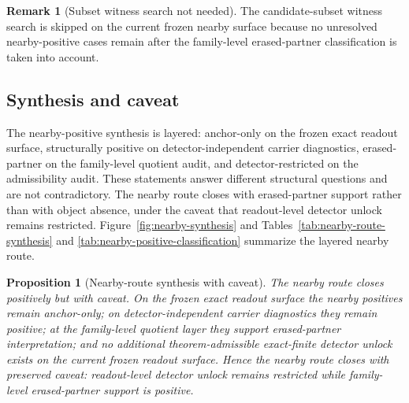 \documentclass[11pt]{article}
\newtheorem{proposition}[theorem]{Proposition}
\theoremstyle{definition}
\newtheorem{remark}[theorem]{Remark}
\begin{document}
\begin{remark}[Subset witness search not needed]
\label{rem:no-nearby-witness-search}
The candidate-subset witness search is skipped on the current frozen nearby surface because no unresolved nearby-positive cases remain after the family-level erased-partner classification is taken into account.
\end{remark}

\subsection{Synthesis and caveat}

The nearby-positive synthesis is layered: anchor-only on the frozen exact readout surface, structurally positive on detector-independent carrier diagnostics, erased-partner on the family-level quotient audit, and detector-restricted on the admissibility audit. These statements answer different structural questions and are not contradictory. The nearby route closes with erased-partner support rather than with object absence, under the caveat that readout-level detector unlock remains restricted. Figure~\ref{fig:nearby-synthesis} and Tables~\ref{tab:nearby-route-synthesis} and \ref{tab:nearby-positive-classification} summarize the layered nearby route.

\begin{proposition}[Nearby-route synthesis with caveat]
\label{prop:nearby-caveat}
The nearby route closes positively but with caveat. On the frozen exact readout surface the nearby positives remain anchor-only; on detector-independent carrier diagnostics they remain positive; at the family-level quotient layer they support erased-partner interpretation; and no additional theorem-admissible exact-finite detector unlock exists on the current frozen readout surface. Hence the nearby route closes with preserved caveat: readout-level detector unlock remains restricted while family-level erased-partner support is positive.
\end{proposition}
\end{document}
